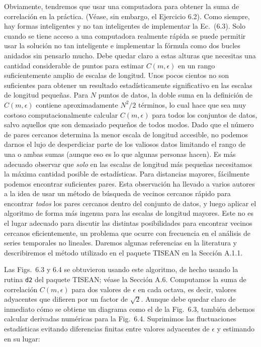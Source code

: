 \documentclass[10pt,a4paper]{book}
\begin{document}
Obviamente, tendremos que usar una computadora para obtener la suma de correlación en la práctica. (Véase, sin embargo, el Ejercicio 6.2). Como siempre, hay formas inteligentes y no tan inteligentes de implementar la Ec.~(6.3). Solo cuando se tiene acceso a una computadora realmente rápida se puede permitir usar la solución no tan inteligente e implementar la fórmula como dos bucles anidados sin pensarlo mucho. Debe quedar claro a estas alturas que necesitas una cantidad considerable de puntos para estimar $C(m, \epsilon)$ en un rango suficientemente amplio de escalas de longitud. Unos pocos cientos no son suficientes para obtener un resultado estadísticamente significativo en las escalas de longitud pequeñas. Para $N$ puntos de datos, la doble suma en la definición de $C(m, \epsilon)$ contiene aproximadamente $N^2/2$ términos, lo cual hace que sea muy costoso computacionalmente calcular $C(m, \epsilon)$ para todos los conjuntos de datos, salvo aquellos que son demasiado pequeños de todos modos. Dado que el número de pares cercanos determina la menor escala de longitud accesible, no podemos darnos el lujo de desperdiciar parte de los valiosos datos limitando el rango de una o ambas sumas (aunque eso es lo que algunas personas hacen). Es más adecuado observar que \textit{solo} en las escalas de longitud más pequeñas necesitamos la máxima cantidad posible de estadísticas. Para distancias mayores, fácilmente podemos encontrar suficientes pares. Esta observación ha llevado a varios autores a la idea de usar un método de búsqueda de vecinos cercanos rápido para encontrar \textit{todos} los pares cercanos dentro del conjunto de datos, y luego aplicar el algoritmo de forma más ingenua para las escalas de longitud mayores. Este no es el lugar adecuado para discutir las distintas posibilidades para encontrar vecinos cercanos eficientemente, un problema que ocurre con frecuencia en el análisis de series temporales no lineales. Daremos algunas referencias en la literatura y describiremos el método utilizado en el paquete TISEAN en la Sección A.1.1.

\bigskip

Las Figs.~6.3 y 6.4 se obtuvieron usando este algoritmo, de hecho usando la rutina \texttt{d2} del paquete TISEAN; véase la Sección A.6. Computamos la suma de correlación $C(m, \epsilon)$ para dos valores de $\epsilon$ en cada octava, es decir, valores adyacentes que difieren por un factor de $\sqrt{2}$. Aunque debe quedar claro de inmediato cómo se obtiene un diagrama como el de la Fig.~6.3, también debemos calcular derivadas numéricas para la Fig.~6.4. Suprimimos las fluctuaciones estadísticas evitando diferencias finitas entre valores adyacentes de $\epsilon$ y estimando en su lugar:
\end{document}
